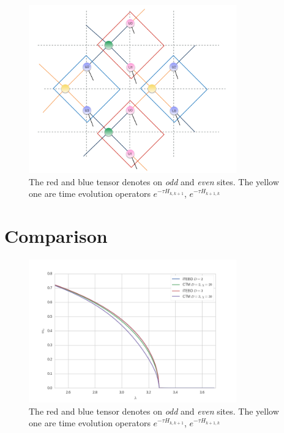 \begin{figure}[ht]
	\centering
	\includegraphics[width=0.80\textwidth]{figures/fig521.png}
	\caption[The picture of the main idea of itebd.]{The red and blue tensor denotes on \textit{odd} and \textit{even} sites. The yellow one are time evolution operators $e^{-\tau H_{k,k+1}}$, $e^{-\tau H_{k+1,k}}$}
	\label{fig521}
\end{figure}

\section{Comparison}

\begin{figure}[ht]
	\centering
	\includegraphics[width=0.80\textwidth]{figures/ctm_itebd.png}
	\caption[The picture of the main idea of itebd.]{The red and blue tensor denotes on \textit{odd} and \textit{even} sites. The yellow one are time evolution operators $e^{-\tau H_{k,k+1}}$, $e^{-\tau H_{k+1,k}}$}
	\label{fig522}
\end{figure}

